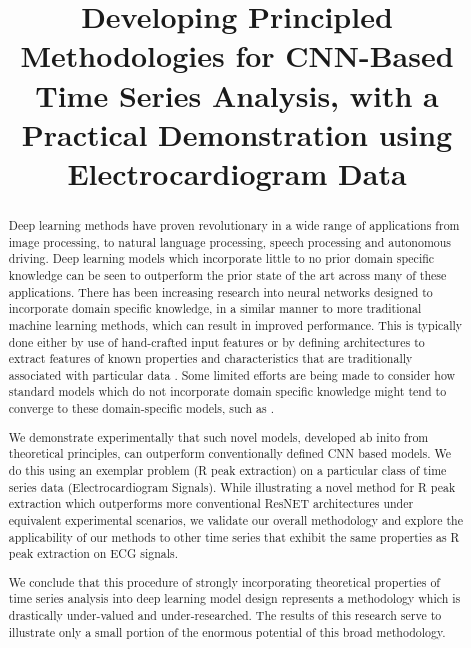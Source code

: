 \documentclass[9pt,conference]{IEEEtran}
\begin{document}
\title{Developing Principled Methodologies for CNN-Based Time Series Analysis, with a Practical Demonstration using Electrocardiogram Data}
\author{
}
\maketitle
\begin{abstract}

Deep learning methods have proven revolutionary in a wide range of applications from image processing, to natural language processing, speech processing and autonomous driving. Deep learning models which incorporate little to no prior domain specific knowledge can be seen to outperform the prior state of the art across many of these applications. There has been increasing research into neural networks designed to incorporate domain specific knowledge, in a similar manner to more traditional machine learning methods, which can result in improved performance. This is typically done either by use of hand-crafted input features or by defining architectures to extract features of known properties and characteristics that are traditionally associated with particular data \cite{medFeatureDNNReview} \cite{preprocessedSpeech}. Some limited efforts are being made to consider how standard models which do not incorporate domain specific knowledge might tend to converge to these domain-specific models, such as \cite{speechCNNTendstoBP}.

We demonstrate experimentally that such novel models, developed ab inito from theoretical principles, can outperform conventionally defined CNN based models. We do this using an exemplar problem (R peak extraction) on a particular class of time series data (Electrocardiogram Signals). While illustrating a novel method for R peak extraction which outperforms more conventional ResNET architectures under equivalent experimental scenarios, we validate our overall methodology and explore the applicability of our methods to other time series that exhibit the same properties as R peak extraction on ECG signals.

We conclude that this procedure of strongly incorporating theoretical properties of time series analysis into deep learning model design represents a methodology which is drastically under-valued and under-researched. The results of this research serve to illustrate only a small portion of the enormous potential of this broad methodology.

\end{abstract}
\end{document}
